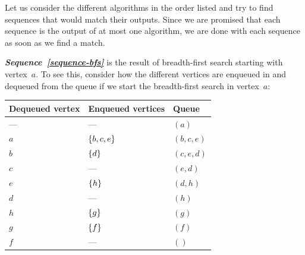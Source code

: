 \documentclass{jn-pset}
\begin{document}
\begin{problem}
\begin{solution}
  Let us consider the different algorithms in the order listed and
  try to find sequences that would match their outputs.
  Since we are promised that each sequence is the output of at most
  one algorithm, we are done with each sequence as soon as we find a
  match.
  
  \textit{\textbf{Sequence~\ref{sequence-bfs}}}
  is the result of breadth-first search starting with vertex~$a$.
  To see this, consider how the different vertices are enqueued in and
  dequeued from the queue if we start the breadth-first search in
  vertex~$a$:

  \medskip
  \noindent
  \begin{tabular}[]{|l|l|l|}
    \hline
    \textbf{Dequeued vertex}
    &
      \textbf{Enqueued vertices}
    &
      \textbf{Queue}
    \\
    \hline
    ---
    &
      ---
    &
      $(a)$
    \\
    $a$
    &
      $\{ b, c, e \}$
    &
      $(b, c, e)$
      \\
    $b$
    &
      $\{ d \}$
    &
      $(c, e, d)$
    \\
    $c$
    &
      ---
    &
      $(e, d)$
    \\
    $e$
    &
      $\{ h \}$
    &
      $(d, h)$
    \\
    $d$
    &
      ---
    &
      $(h)$
    \\
    $h$
    &
      $\{ g \}$
    &
      $(g)$
    \\
    $g$
    &
      $\{ f \}$
    &
      $(f)$
    \\
    $f$
    &
      ---
    &
      $()$
    \\
    \hline
  \end{tabular}

  \bigskip


\end{solution}
\end{problem}
\end{document}
